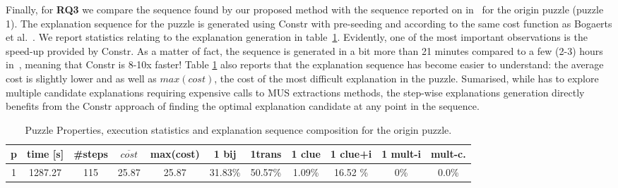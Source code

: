 Finally, for \textbf{RQ3} we compare the sequence found by our proposed method with the sequence reported on in~\cite{ecai/BogaertsGCG20} for the origin puzzle (puzzle 1). 
The explanation sequence for the puzzle is generated using \omus Constr with pre-seeding and according to the same cost function as Bogaerts et al.~\cite{ecai/BogaertsGCG20}. We report statistics relating to the explanation generation in table~\ref{table:experiment3}.
Evidently, one of the most important observations is the speed-up provided by \omus Constr. 
As a matter of fact, the sequence is generated in a bit more than 21 minutes compared to a few (2-3) hours in~\cite{ecai/BogaertsGCG20}, meaning that \omus Constr is 8-10x faster!
Table \ref{table:experiment3} also reports that the explanation sequence has become easier to understand: the average cost is slightly lower and as well as $max(cost)$, the cost of the most difficult explanation in the puzzle. 
Sumarised, while \cite{ecai/BogaertsGCG20} has to explore multiple candidate explanations requiring expensive calls to MUS extractions methods, the step-wise explanations generation directly benefits from the \omus Constr approach of finding the optimal explanation candidate at any point in the sequence.

\begin{table}
    \centering
    \begin{tabular}{c|cccc|cccccc}
        p &  time [s] &  \#steps &   $\overline{cost}$ & max(cost) &    1 bij &  1trans &  1 clue & 1 clue+i & 1 mult-i & mult-c. \\
        \hline
        1 &  1287.27 &     115 &     25.87  &    25.87  &  31.83\% &  50.57\% &  1.09\% &    16.52 \% &     0\% &    0.0\% \\
        \end{tabular}
        \caption{Puzzle Properties, execution statistics and explanation sequence composition for the origin puzzle.}
        \label{table:experiment3}
\end{table}


%


